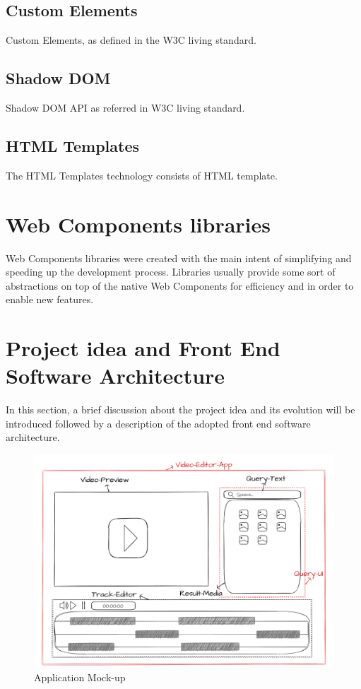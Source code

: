 \subsection{Custom Elements}

Custom Elements, as defined in the W3C living standard.

\subsection{Shadow DOM}

Shadow DOM API as referred in W3C living standard.

\subsection{HTML Templates}

The HTML Templates technology consists of HTML template.

\section{Web Components libraries}

Web Components libraries were created with the main intent of simplifying and speeding up the development process. Libraries usually provide some sort of abstractions on top of the native Web Components for efficiency and in order to enable new features.

\section{Project idea and Front End Software Architecture}

In this section, a brief discussion about the project idea and its evolution will be introduced followed by a description of the adopted front end software architecture.

\begin{figure}[H]
\centering
\includegraphics[width=1\textwidth]{images/Wireframe.png}
\caption{Application Mock-up}
\label{fig:appMockUp}
\end{figure}


